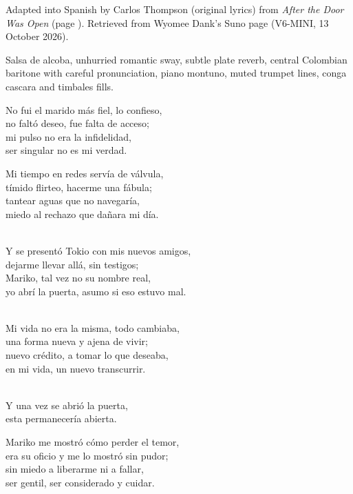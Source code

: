 
\label{sec:la-puerta-abierta}
\begin{notes}
Adapted into Spanish by Carlos Thompson (original lyrics) from \emph{After the Door Was Open} (page \pageref{sec:after-the-door-was-open}). Retrieved from Wyomee Dank's Suno page (V6-MINI, 13 October 2026).
\end{notes}
\begin{style}
Salsa de alcoba, unhurried romantic sway, subtle plate reverb, central Colombian baritone with careful pronunciation, piano montuno, muted trumpet lines, conga cascara and timbales fills.
\end{style}
\begin{lyrics}
No fui el marido más fiel, lo confieso,\\
no faltó deseo, fue falta de acceso;\\
mi pulso no era la infidelidad,\\
ser singular no es mi verdad.

Mi tiempo en redes servía de válvula,\\
tímido flirteo, hacerme una fábula;\\
tantear aguas que no navegaría,\\
miedo al rechazo que dañara mi día.

\\
Y se presentó Tokio con mis nuevos amigos,\\
dejarme llevar allá, sin testigos;\\
Mariko, tal vez no su nombre real,\\
yo abrí la puerta, asumo si eso estuvo mal.

\\
Mi vida no era la misma, todo cambiaba,\\
una forma nueva y ajena de vivir;\\
nuevo crédito, a tomar lo que deseaba,\\
en mi vida, un nuevo transcurrir.

\\
Y una vez se abrió la puerta,\\
esta permanecería abierta.

Mariko me mostró cómo perder el temor,\\
era su oficio y me lo mostró sin pudor;\\
sin miedo a liberarme ni a fallar,\\
ser gentil, ser considerado y cuidar.


\end{lyrics}
